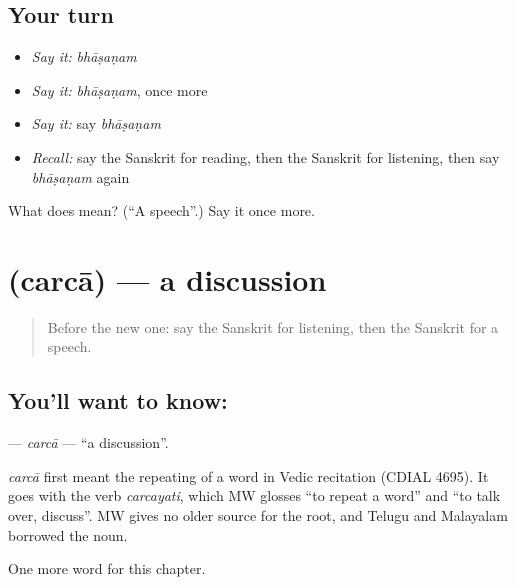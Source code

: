 \subsection*{Your turn}
\begin{itemize}
\raggedright
  \item \emph{Say it:} \emph{bhāṣaṇam}
  \item \emph{Say it:} \emph{bhāṣaṇam}, once more
  \item \emph{Say it:} say \emph{bhāṣaṇam}
  \item \emph{Recall:} say the Sanskrit for reading, then the Sanskrit for listening, then say \emph{bhāṣaṇam} again
\end{itemize}

\begin{tcolorbox}[breakable,colback=teal!4,colframe=teal!35!black,title={Before you move on}]
What does  mean? (\textquotedblleft{}A speech\textquotedblright{}.) Say it once more.
\end{tcolorbox}
\section[\texorpdfstring{\sk{चर्चा} (carcā)}{चर्चा (carcā)}]{ (carcā) — a discussion}

\label{lesson:SA-C200-carca}



\begin{quote}
Before the new one: say the Sanskrit for listening, then the Sanskrit for a speech.
\end{quote}

\subsection*{You'll want to know: }
\textbf{} — \emph{carcā} — \textquotedblleft{}a discussion\textquotedblright{}.

\begin{cousinweb}
\emph{carcā} first meant the repeating of a word in Vedic recitation (CDIAL 4695). It goes with the verb \emph{carcayati}, which MW glosses \textquotedblleft{}to repeat a word\textquotedblright{} and \textquotedblleft{}to talk over, discuss\textquotedblright{}. MW gives no older source for the root, and Telugu and Malayalam borrowed the noun.
\end{cousinweb}

\begin{grammarlens}[title={What you've built}]
One more word for this chapter.
\end{grammarlens}

